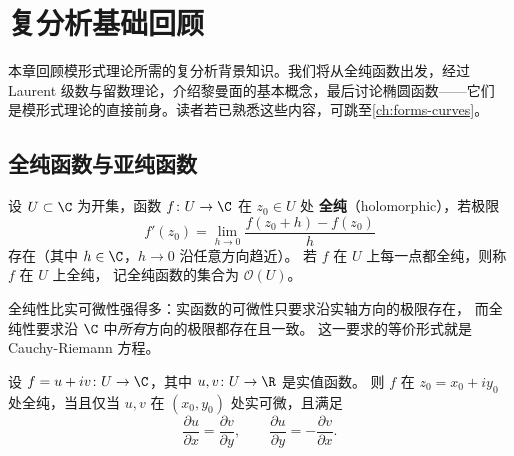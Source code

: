 \chapter{复分析基础回顾}
\label{ch:complex-analysis}

本章回顾模形式理论所需的复分析背景知识。我们将从全纯函数出发，经过
Laurent 级数与留数理论，介绍黎曼面的基本概念，最后讨论椭圆函数——它们
是模形式理论的直接前身。读者若已熟悉这些内容，可跳至\cref{ch:forms-curves}。

\section{全纯函数与亚纯函数}
\label{sec:holomorphic}

\begin{definition}[全纯函数]
\label{def:holomorphic}
设 $U \subset \C$ 为开集，函数 $f\colon U \to \C$ 在 $z_0 \in U$ 处
\textbf{全纯}（holomorphic），若极限
\[
  f'(z_0) = \lim_{h \to 0} \frac{f(z_0 + h) - f(z_0)}{h}
\]
存在（其中 $h \in \C$，$h \to 0$ 沿任意方向趋近）。
若 $f$ 在 $U$ 上每一点都全纯，则称 $f$ 在 $U$ 上全纯，
记全纯函数的集合为 $\mathcal{O}(U)$。
\end{definition}

\begin{remark}
全纯性比实可微性强得多：实函数的可微性只要求沿实轴方向的极限存在，
而全纯性要求沿 $\C$ 中\emph{所有}方向的极限都存在且一致。
这一要求的等价形式就是 Cauchy-Riemann 方程。
\end{remark}

\begin{theorem}
\label{thm:cauchy-riemann}
设 $f = u + iv\colon U \to \C$，其中 $u, v\colon U \to \R$ 是实值函数。
则 $f$ 在 $z_0 = x_0 + iy_0$ 处全纯，当且仅当 $u, v$ 在 $(x_0, y_0)$
处实可微，且满足
\[
  \frac{\partial u}{\partial x} = \frac{\partial v}{\partial y},
  \qquad
  \frac{\partial u}{\partial y} = -\frac{\partial v}{\partial x}.
\]
\end{theorem}

